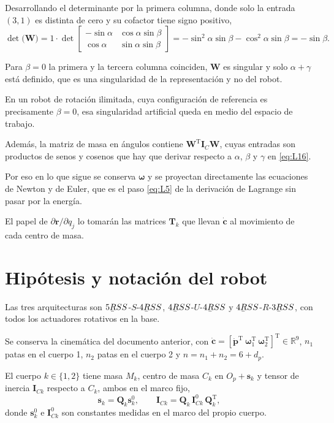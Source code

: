 \documentclass[11pt]{article}
\newcommand{\barbelow}[1]{\underaccent{\bar}{#1}}
\newcommand{\T}{^{\mathrm{T}}}
\newcommand{\pvec}{\mathbf{p}}
\newcommand{\wv}{\boldsymbol{\omega}}
\newcommand{\cd}{\dot{\mathbf{c}}}
\newcommand{\IC}[1]{\mathbf{I}_{C#1}}
\begin{document}
Desarrollando el determinante por la primera columna, donde solo la entrada $(3,1)$ es distinta de cero y su cofactor tiene signo positivo,
\begin{equation}
\det\!\big(\mathbf{W}\big)
=1\cdot\det\!\begin{bmatrix}-\sin\alpha & \cos\alpha\sin\beta\\ \cos\alpha & \sin\alpha\sin\beta\end{bmatrix}
=-\sin^2\alpha\sin\beta-\cos^2\alpha\sin\beta
=-\sin\beta .
\label{eq:O4}
\end{equation}

Para $\beta=0$ la primera y la tercera columna coinciden, $\mathbf{W}$ es singular y solo $\alpha+\gamma$ está definido, que es una singularidad de la representación y no del robot.

En un robot de rotación ilimitada, cuya configuración de referencia es precisamente $\beta=0$, esa singularidad artificial queda en medio del espacio de trabajo.

Además, la matriz de masa en ángulos contiene $\mathbf{W}\T\mathbf{I}_C\mathbf{W}$, cuyas entradas son productos de senos y cosenos que hay que derivar respecto a $\alpha$, $\beta$ y $\gamma$ en \eqref{eq:L16}.

Por eso en lo que sigue se conserva $\wv$ y se proyectan directamente las ecuaciones de Newton y de Euler, que es el paso \eqref{eq:L5} de la derivación de Lagrange sin pasar por la energía.

El papel de $\partial\mathbf{r}/\partial q_j$ lo tomarán las matrices $\mathbf{T}_k$ que llevan $\cd$ al movimiento de cada centro de masa.

\section{Hipótesis y notación del robot}

Las tres arquitecturas son $5\barbelow{R}SS$-$S$-$4\barbelow{R}SS$, $4\barbelow{R}SS$-$U$-$4\barbelow{R}SS$ y $4\barbelow{R}SS$-$R$-$3\barbelow{R}SS$, con todos los actuadores rotativos en la base.

Se conserva la cinemática del documento anterior, con $\cd=[\dot{\pvec}\T\ \wv_1\T\ \wv_2\T]\T\in\mathbb{R}^9$, $n_1$ patas en el cuerpo 1, $n_2$ patas en el cuerpo 2 y $n=n_1+n_2=6+d_p$.

El cuerpo $k\in\{1,2\}$ tiene masa $M_k$, centro de masa $C_k$ en $O_p+\mathbf{s}_k$ y tensor de inercia $\IC{k}$ respecto a $C_k$, ambos en el marco fijo,
\begin{equation}
\mathbf{s}_k=\mathbf{Q}_k\mathbf{s}_k^{0},
\qquad
\IC{k}=\mathbf{Q}_k\,\IC{k}^{0}\,\mathbf{Q}_k\T ,
\label{eq:datos}
\end{equation}
donde $\mathbf{s}_k^{0}$ e $\IC{k}^{0}$ son constantes medidas en el marco del propio cuerpo.
\end{document}

